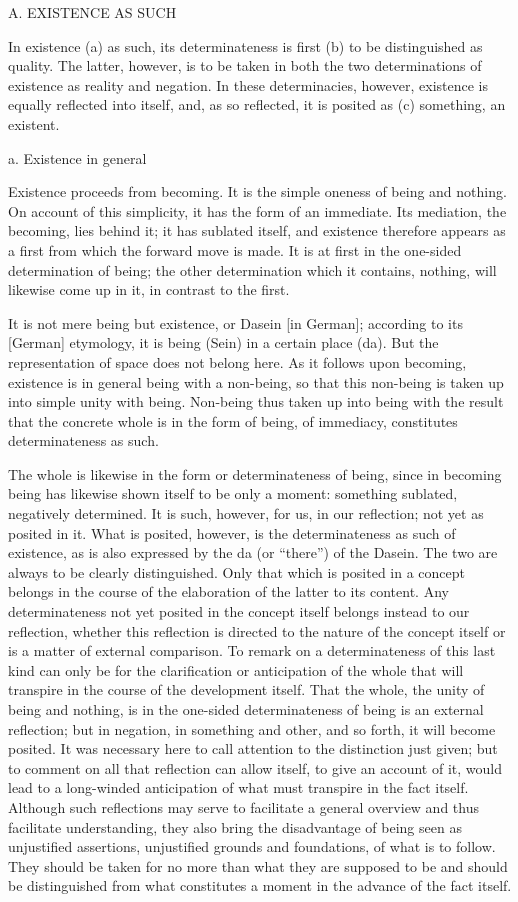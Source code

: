 
A. EXISTENCE AS SUCH

In existence
(a) as such, its determinateness is first
(b) to be distinguished as quality.
The latter, however, is to be taken in
both the two determinations of
existence as reality and negation.
In these determinacies, however,
existence is equally reflected into itself,
and, as so reflected, it is posited as
(c) something, an existent.

a. Existence in general

Existence proceeds from becoming.
It is the simple oneness of being and nothing.
On account of this simplicity,
it has the form of an immediate.
Its mediation, the becoming, lies behind it;
it has sublated itself,
and existence therefore appears as a first
from which the forward move is made.
It is at first in the one-sided determination of being;
the other determination which it contains, nothing,
will likewise come up in it,
in contrast to the first.

It is not mere being but existence,
or Dasein [in German];
according to its [German] etymology,
it is being (Sein) in a certain place (da).
But the representation of space does not belong here.
As it follows upon becoming,
existence is in general
being with a non-being,
so that this non-being is taken up
into simple unity with being.
Non-being thus taken up into being
with the result that the concrete whole is
in the form of being, of immediacy,
constitutes determinateness as such.

The whole is likewise in the form
or determinateness of being,
since in becoming being has likewise
shown itself to be only a moment:
something sublated, negatively determined.
It is such, however, for us, in our reflection;
not yet as posited in it.
What is posited, however, is
the determinateness as such of existence,
as is also expressed by the da (or “there”) of the Dasein.
The two are always to be clearly distinguished.
Only that which is posited in a concept
belongs in the course of the elaboration
of the latter to its content.
Any determinateness not yet posited
in the concept itself
belongs instead to our reflection,
whether this reflection is directed to
the nature of the concept itself
or is a matter of external comparison.
To remark on a determinateness
of this last kind can only be
for the clarification or anticipation of the whole
that will transpire in the course of the development itself.
That the whole, the unity of being and nothing,
is in the one-sided determinateness of being
is an external reflection;
but in negation, in something and other,
and so forth, it will become posited.
It was necessary here to call attention to
the distinction just given;
but to comment on all
that reflection can allow itself,
to give an account of it,
would lead to a long-winded anticipation
of what must transpire in the fact itself.
Although such reflections may
serve to facilitate a general overview
and thus facilitate understanding,
they also bring the disadvantage of
being seen as unjustified assertions,
unjustified grounds and foundations,
of what is to follow.
They should be taken for no more than
what they are supposed to be
and should be distinguished from
what constitutes a moment in
the advance of the fact itself.

